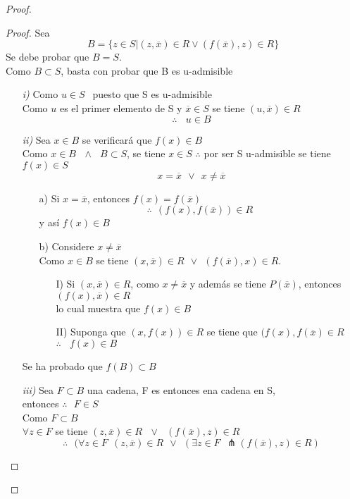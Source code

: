 \begin{proof}
\begin{proof}
Sea $$ B =  \lbrace z \in S \vert (z,\overline{x}) \in R \vee (f(\overline{x}),z) \in R \rbrace $$
 Se debe probar que $B=S$.\\
Como $B \subset S$, basta con probar que B es u-admisible
\begin{itemize}
\item[\textit{i)}] Como  $ u \in S \ \ $ puesto que S es u-admisible\\
Como $u$ es el  primer elemento de S y $ \overline{x} \in S $ se tiene $ (u, \overline{x}) \in R $
$$ \therefore \ \ \ \ u \in B $$
\item[\textit{ii)}] Sea $x \in B$ se verificará que $ f(x) \in B $\\
Como $ x \in B \ \ \ \wedge \ \ \  B \subset S $, se tiene $x \in S$ $ \therefore$ por ser S u-admisible se tiene $f(x) \in S $ 
$$ x = \overline{x} \ \ \vee \ \  x \neq \overline{x} $$
\begin{itemize}
\item[a)] Si $ x = \overline{x} $,  entonces $ f(x) = f(\overline{x}) $
$$ \therefore \ \ (f(x), f(\overline{x})) \in R $$
y así $f(x) \in B$
\item[b)]
Considere $ x \neq \overline{x} $ \\
Como $x \in B$ se tiene $(x,\overline{x}) \in R \ \  \vee \ \ (f(\overline{x}),x) \in R$.  \\
\begin{itemize}
\item[I)] Si $ (x,\overline{x}) \in R $, como $ x \neq \overline{x} $ y además se tiene $ P(\overline{x}) $,  entonces $ (f(x),\overline{x}) \in R $\\
 lo cual  muestra que $ f(x) \in B $
\item[II)] Suponga que $ (x,f(x)) \in R $ se tiene que $ (f(x), f(\overline{x}) \in R $ \\
$ \therefore \ \ \ \  f(x) \in B $

\end{itemize}

\end{itemize}
Se ha probado que $ f(B) \subset B $

\item[\textit{iii)}] Sea $ F \subset B $ una cadena, F es entonces ena cadena en S,\\
 entonces  $ \therefore \ \ \ F \in S  $\\
 Como $ F \subset  B $\\
 $ \forall z \in  F $ se tiene $ (z, \overline{x}) \in R \ \ \ \vee \ \ \ (f(\overline{x}), z) \in R $
 $$ \therefore \ \ \  (\forall z \in F \ \  (z,\overline{x}) \in R \ \ \vee \ \  (\exists z \in F \ \ \pitchfork (f(\overline{x}),z) \in R ) $$
 

\end{itemize}
\end{proof}
\end{proof}
